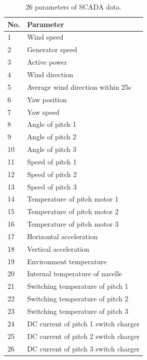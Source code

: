 \documentclass[lettersize,journal]{IEEEtran}
\begin{document}
\begin{table}[htb]
\centering
\caption{26 parameters of SCADA data.}
\label{variable}
\begin{tabular}{l|l}
\toprule%
No. & Parameter                            \\ \hline
1   & Wind speed                           \\
2   & Generator speed                      \\
3   & Active power                         \\
4   & Wind direction                       \\
5   & Average wind direction within 25s    \\
6   & Yaw position                         \\
7   & Yaw speed                            \\
8   & Angle of pitch 1                     \\
9   & Angle of pitch 2                     \\
10  & Angle of pitch 3                     \\
11  & Speed of pitch 1                     \\
12  & Speed of pitch 2                     \\
13  & Speed of pitch 3                     \\
14  & Temperature of pitch motor 1         \\
15  & Temperature of pitch motor 2         \\
16  & Temperature of pitch motor 3         \\
17  & Horizontal acceleration              \\
18  & Vertical acceleration                \\
19  & Environment temperature              \\
20  & Internal temperature of nacelle      \\
21  & Switching temperature of pitch 1     \\
22  & Switching temperature of pitch 2     \\
23  & Switching temperature of pitch 3     \\
24  & DC current of pitch 1 switch charger \\
25  & DC current of pitch 2 switch charger \\
26  & DC current of pitch 3 switch charger \\ 
\bottomrule%
\end{tabular}
\end{table}
\end{document}
